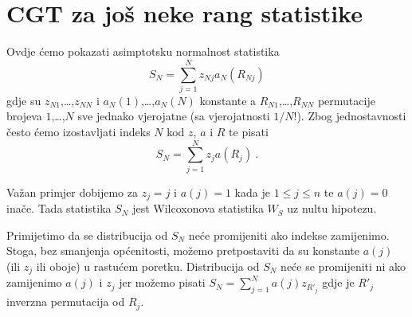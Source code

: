 \chapter{CGT za jo\v{s} neke rang statistike}

Ovdje \'{c}emo pokazati asimptotsku normalnost statistika
\begin{equation}
S_{N} = \sum_{j=1}^{N} z_{Nj} a_{N} (R_{Nj})
\end{equation}
gdje su $z_{N1}$,\dots,$z_{NN}$ i $a_{N} (1)$,\dots,$a_{N} (N)$ konstante
a $R_{N1}$,\dots,$R_{NN}$ permutacije brojeva $1$,\dots,$N$ sve jednako
vjerojatne (sa vjerojatnosti $1/N!$). Zbog jednostavnosti \v{c}esto \'{c}emo
izostavljati indeks $N$ kod $z$, $a$ i $R$ te pisati
\begin{equation}
S_{N} = \sum_{j=1}^{N} z_{j} a (R_{j}) \ \mathrm{.}
\end{equation}

Va\v{z}an primjer dobijemo za $z_{j}=j$ i $a(j)=1$ kada je $1 \leq j \leq n$ te $a(j)=0$
ina\v{c}e. Tada statistika $S_{N}$ jest Wilcoxonova statistika $W_{S}$
uz nultu hipotezu.

Primijetimo  da se distribucija od $S_{N}$ ne\'{c}e promijeniti ako indekse zamijenimo.
Stoga, bez smanjenja op\'{c}enitosti, mo\v{z}emo pretpostaviti da su konstante $a(j)$
(ili $z_{j}$ ili oboje) u rastu\'{c}em poretku. Distribucija od $S_{N}$ ne\'{c}e se
promijeniti ni ako zamijenimo $a(j)$ i $z_{j}$ jer mo\v{z}emo pisati
$S_{N} = \sum_{j=1}^{N} a(j) z_{{R'}_{j}}$ gdje je ${R'}_{j}$ inverzna permutacija
od $R_{j}$.

